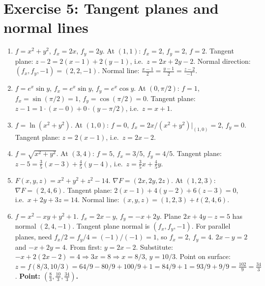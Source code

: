 \documentclass[12pt,a4paper]{article}
\begin{document}
\section*{Exercise 5: Tangent planes and normal lines}

\begin{enumerate}[leftmargin=*, label=(\alph*)]

\item $f=x^2+y^2$, $f_x=2x$, $f_y=2y$. At $(1,1)$: $f_x=2$, $f_y=2$, $f=2$.
Tangent plane: $z-2=2(x-1)+2(y-1)$, i.e.\ $z=2x+2y-2$.
Normal direction: $(f_x,f_y,-1)=(2,2,-1)$. Normal line: $\frac{x-1}{2}=\frac{y-1}{2}=\frac{z-2}{-1}$.

\item $f=e^x\sin y$, $f_x=e^x\sin y$, $f_y=e^x\cos y$.
At $(0,\pi/2)$: $f=1$, $f_x=\sin(\pi/2)=1$, $f_y=\cos(\pi/2)=0$.
Tangent plane: $z-1=1\cdot(x-0)+0\cdot(y-\pi/2)$, i.e.\ $z=x+1$.

\item $f=\ln(x^2+y^2)$. At $(1,0)$: $f=0$, $f_x=2x/(x^2+y^2)|_{(1,0)}=2$, $f_y=0$.
Tangent plane: $z=2(x-1)$, i.e.\ $z=2x-2$.

\item $f=\sqrt{x^2+y^2}$. At $(3,4)$: $f=5$, $f_x=3/5$, $f_y=4/5$.
Tangent plane: $z-5=\frac{3}{5}(x-3)+\frac{4}{5}(y-4)$, i.e.\ $z=\frac{3}{5}x+\frac{4}{5}y$.

\item $F(x,y,z)=x^2+y^2+z^2-14$. $\nabla F=(2x,2y,2z)$. At $(1,2,3)$: $\nabla F=(2,4,6)$.
Tangent plane: $2(x-1)+4(y-2)+6(z-3)=0$, i.e.\ $x+2y+3z=14$.
Normal line: $(x,y,z)=(1,2,3)+t(2,4,6)$.

\item $f=x^2-xy+y^2+1$. $f_x=2x-y$, $f_y=-x+2y$.
Plane $2x+4y-z=5$ has normal $(2,4,-1)$. Tangent plane normal is $(f_x,f_y,-1)$.
For parallel planes, need $f_x/2=f_y/4=(-1)/(-1)=1$, so $f_x=2$, $f_y=4$.
$2x-y=2$ and $-x+2y=4$. From first: $y=2x-2$. Substitute: $-x+2(2x-2)=4\Rightarrow 3x=8\Rightarrow x=8/3$, $y=10/3$.
Point on surface: $z=f(8/3,10/3)=64/9-80/9+100/9+1=84/9+1=93/9+9/9=\frac{102}{9}=\frac{34}{3}$.
\textbf{Point: $\left(\frac{8}{3},\frac{10}{3},\frac{34}{3}\right)$.}

\end{enumerate}
\end{document}
